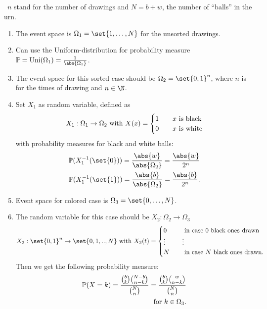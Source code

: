 \subsection{}

\begin{solution}\ $n$ stand for the number of drawings and $N = b+w$, the number of ``balls'' in the urn.
	\begin{enumerate}[label=\alph*)]
		\item The event space is $\Omega_1 = \set{1,\dots, N}$ for the unsorted drawings.
		\item Can use the Uniform-distribution for probability measure $\Meas = \Uni(\Omega_1) = \frac{1}{\abs{\Omega_1}}$.
		\item The event space for this sorted case should be $\Omega_2 = \set{0,1}^n$, where $n$ is for the times of drawing and $n \in \N$.
		\item Set $X_1$ as random variable, defined as 
		\begin{align*}
			X_1: \Omega_1 \to \Omega_2 \text{ with } 
			X(x) = \begin{cases}
				1 \quad &x \text{ is black}\\
				0 \quad &x \text{ is white}
			\end{cases}
		\end{align*}
		with probability measures for black and white balls:
		\begin{align*}
			\Meas(X_1^{-1}(\set{0})) = \frac{\abs{w}}{\abs{\Omega_2}} = \frac{\abs{w}}{2^n}\\
			\Meas(X_1^{-1}(\set{1})) = \frac{\abs{b}}{\abs{\Omega_2}} = \frac{\abs{b}}{2^n}.
		\end{align*}
		\item Event space for colored case is $\Omega_3 = \set{0,\dots, N}$.
		\item The random variable for this case should be $X_2 : \Omega_2 \to \Omega_3$
		\begin{align*}
			X_2: \set{0,1}^n \to \set{0,1,..,N} \with
			X_2(t) = \begin{cases}
			0 \quad &\text{ in case 0 black ones drawn}\\
			\vdots &\vdots\\
			N \quad &\text{ in case $N$ black ones drawn}.
			\end{cases}
		\end{align*}
		Then we get the following probability measure:
		\begin{align*}
			\mathbb{P}(X = k) = \frac{\binom{b}{k}\binom{N-b}{n-k}}{\binom{N}{n}} = \frac{\binom{b}{k}\binom{w}{n-k}}{\binom{N}{n}}\\ \text{ for } k \in \Omega_3.
		\end{align*}
	\end{enumerate}
\end{solution}

